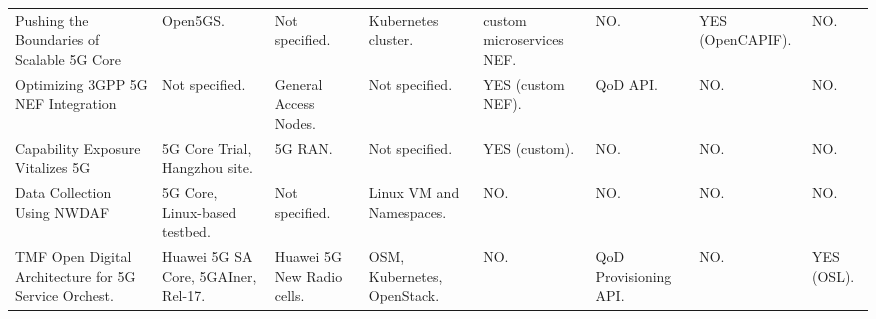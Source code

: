 \begin{table}[ht]
\begin{tabular}{p{2cm} p{2cm} p{2cm} p{2cm} p{1.4cm} p{1.4cm} p{1.4cm} p{1.4cm}}
Pushing the Boundaries of Scalable 5G Core~\cite{pushingBoundariesScalable5GCN} & Open5GS. & Not specified. & Kubernetes cluster. & custom microservices \acs{NEF}. & NO. & YES (OpenCAPIF). & NO. \\
Optimizing \acs{3GPP} \acs{5G} \acs{NEF} Integration~\cite{optimizing5GNEFIntegrationThroughNEFandUPF} & Not specified. & General Access Nodes. & Not specified. & YES (custom \acs{NEF}). & \acs{QoD} \acs{API}. & NO. & NO. \\
Capability Exposure Vitalizes \acs{5G}~\cite{CapabilityExposureVitalizes5GNetwork} & \acs{5G} Core Trial, Hangzhou site. & \acs{5G} \acs{RAN}. & Not specified. & YES (custom). & NO. & NO. & NO. \\
Data Collection Using \acs{NWDAF}~\cite{DataCollectionUsingNWDAF5GCN} & \acs{5G} Core, Linux-based testbed. & Not specified. & Linux \acs{VM} and Namespaces. & NO. & NO. & NO. & NO. \\
\acs{TMF} Open Digital Architecture for \acs{5G} Service Orchest.~\cite{TMFOpenDigitalArchitecture5GServiceOrchestration} & Huawei \acs{5G} \acs{SA} Core, 5GAIner, Rel-17. & Huawei \acs{5G} New Radio cells. & \acs{OSM}, Kubernetes, OpenStack. & NO. & \acs{QoD} Provisioning \acs{API}. & NO. & YES (\acs{OSL}). \\
\bottomrule
\end{tabular}
\end{table}


